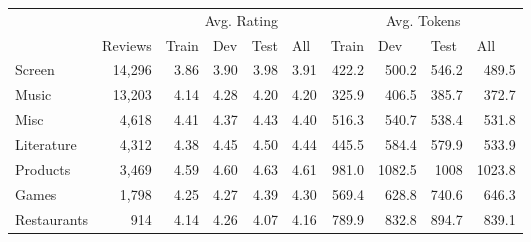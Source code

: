 \begin{table}[]
	\centering
		\begin{tabular}{@{}lrrrrrrrrr@{}}
			\toprule
			& \multicolumn{1}{l}{}        & \multicolumn{4}{c}{Avg. Rating}                                                                          & \multicolumn{4}{c}{Avg. Tokens}                                                                          \\ \cmidrule(l){3-10} 
			& \multicolumn{1}{l}{Reviews} & \multicolumn{1}{l}{Train} & \multicolumn{1}{l}{Dev} & \multicolumn{1}{l}{Test} & \multicolumn{1}{l}{All} & \multicolumn{1}{l}{Train} & \multicolumn{1}{l}{Dev} & \multicolumn{1}{l}{Test} & \multicolumn{1}{l}{All} \\ \midrule
			Screen      & 14,296                      & 3.86                      & 3.90                    & 3.98                     & 3.91                    & 422.2                     & 500.2                   & 546.2                    & 489.5                   \\
			Music       & 13,203                      & 4.14                      & 4.28                    & 4.20                     & 4.20                    & 325.9                     & 406.5                   & 385.7                    & 372.7                   \\
			Misc        & 4,618                       & 4.41                      & 4.37                    & 4.43                     & 4.40                    & 516.3                     & 540.7                   & 538.4                    & 531.8                   \\
			Literature  & 4,312                       & 4.38                      & 4.45                    & 4.50                     & 4.44                    & 445.5                     & 584.4                   & 579.9                    & 533.9                   \\
			Products    & 3,469                       & 4.59                      & 4.60                    & 4.63                     & 4.61                    & 981.0                     & 1082.5                  & 1008                     & 1023.8                  \\
			Games       & 1,798                       & 4.25                      & 4.27                    & 4.39                     & 4.30                    & 569.4                     & 628.8                   & 740.6                    & 646.3                   \\
			Restaurants & 914                         & 4.14                      & 4.26                    & 4.07                     & 4.16                    & 789.9                     & 832.8                   & 894.7                    & 839.1                   \\

\end{tabular}
\end{table}
